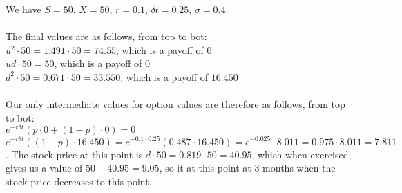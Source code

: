 \documentclass{article}
\begin{document}
{We have $S = 50$, $X = 50$, $r = 0.1$, $\delta t = 0.25$, $\sigma = 0.4$. \\ \\
The final values are as follows, from top to bot: \\
$u^2 \cdot 50 = 1.491 \cdot 50 = 74.55$, which is a payoff of $0$ \\
$ud \cdot 50 = 50$, which is a payoff of $0$ \\
$d^2 \cdot 50 = 0.671 \cdot 50 = 33.550$, which is a payoff of $16.450$ \\ \\
Our only intermediate values for option values are therefore as follows, from top to bot: \\
$e^{-r \delta t} (p \cdot 0 + (1-p) \cdot 0) = 0$ \\
$e^{-r \delta t} ((1-p) \cdot 16.450) = e^{-0.1 \cdot 0.25} (0.487 \cdot 16.450) = e^{-0.025} \cdot 8.011 = 0.975 \cdot 8.011 = 7.811$. The stock price at this point is $d \cdot 50 = 0.819 \cdot 50 = 40.95$, which when exercised, gives us a value of $50 - 40.95 = 9.05$, so it  at this point at 3 months when the stock price decreases to this point.

}
\end{document}
